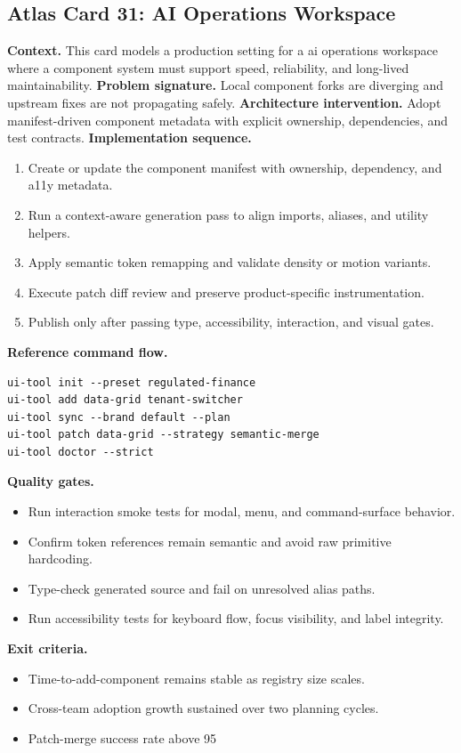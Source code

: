 \subsection*{Atlas Card 31: AI Operations Workspace}
\textbf{Context.} This card models a production setting for a ai operations workspace where a component system must support speed, reliability, and long-lived maintainability.
\textbf{Problem signature.} Local component forks are diverging and upstream fixes are not propagating safely.
\textbf{Architecture intervention.} Adopt manifest-driven component metadata with explicit ownership, dependencies, and test contracts.
\textbf{Implementation sequence.}
\begin{enumerate}[leftmargin=*, itemsep=0.28em]
  \item Create or update the component manifest with ownership, dependency, and a11y metadata.
  \item Run a context-aware generation pass to align imports, aliases, and utility helpers.
  \item Apply semantic token remapping and validate density or motion variants.
  \item Execute patch diff review and preserve product-specific instrumentation.
  \item Publish only after passing type, accessibility, interaction, and visual gates.
\end{enumerate}
\textbf{Reference command flow.}
\begin{verbatim}
ui-tool init --preset regulated-finance
ui-tool add data-grid tenant-switcher
ui-tool sync --brand default --plan
ui-tool patch data-grid --strategy semantic-merge
ui-tool doctor --strict
\end{verbatim}
\textbf{Quality gates.}
\begin{itemize}[leftmargin=*, itemsep=0.24em]
  \item Run interaction smoke tests for modal, menu, and command-surface behavior.
  \item Confirm token references remain semantic and avoid raw primitive hardcoding.
  \item Type-check generated source and fail on unresolved alias paths.
  \item Run accessibility tests for keyboard flow, focus visibility, and label integrity.
\end{itemize}
\textbf{Exit criteria.}
\begin{itemize}[leftmargin=*, itemsep=0.24em]
  \item Time-to-add-component remains stable as registry size scales.
  \item Cross-team adoption growth sustained over two planning cycles.
  \item Patch-merge success rate above 95%
\end{itemize}
\clearpage
